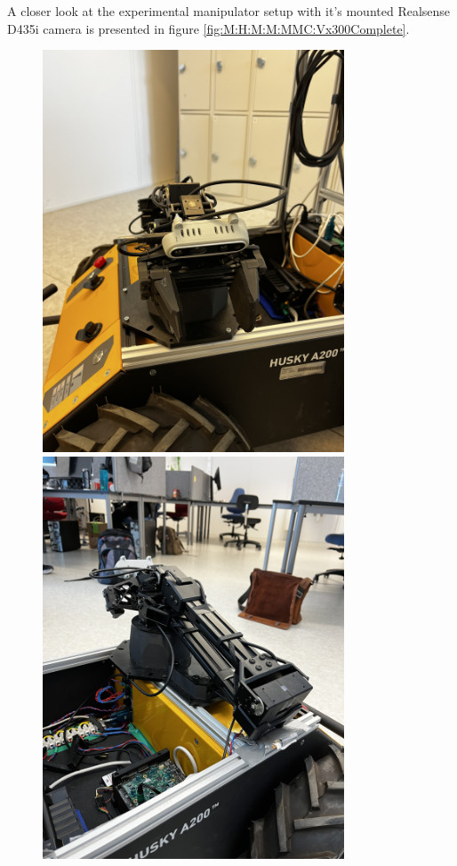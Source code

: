 A closer look at the experimental manipulator setup with it's mounted Realsense D435i camera is presented in figure \ref{fig:M:H:M:M:MMC:Vx300Complete}.

\begin{figure}[H]
  \centering
  \begin{minipage}[b]{0.49\textwidth}
        \centering
        \includegraphics[angle=-90,width = 0.8\textwidth]{Figures/figVX300PhysComplete1.jpg}
  \end{minipage}
  \hfill
  \begin{minipage}[b]{0.49\textwidth}
    \centering
    \includegraphics[angle=-90,width = 0.8\textwidth]{Figures/figVX300PhysComplete5.jpg}

\end{minipage}
\end{figure}

